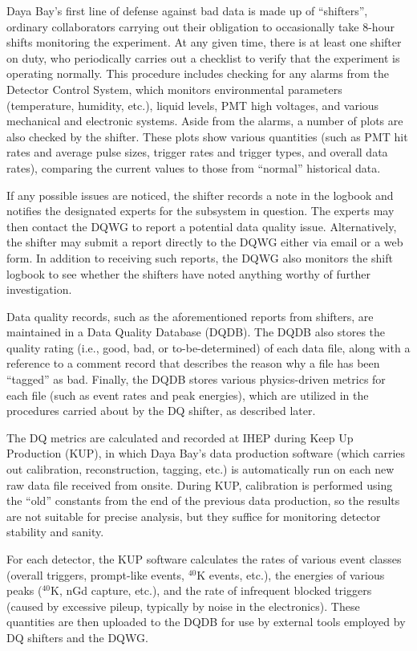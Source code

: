 \documentclass[../thesis.tex]{subfiles}
\begin{document}
Daya Bay's first line of defense against bad data is made up of ``shifters'', ordinary collaborators carrying out their obligation to occasionally take 8-hour shifts monitoring the experiment. At any given time, there is at least one shifter on duty, who periodically carries out a checklist to verify that the experiment is operating normally. This procedure includes checking for any alarms from the Detector Control System, which monitors environmental parameters (temperature, humidity, etc.), liquid levels, PMT high voltages, and various mechanical and electronic systems. Aside from the alarms, a number of plots are also checked by the shifter. These plots show various quantities (such as PMT hit rates and average pulse sizes, trigger rates and trigger types, and overall data rates), comparing the current values to those from ``normal'' historical data.

If any possible issues are noticed, the shifter records a note in the logbook and notifies the designated experts for the subsystem in question. The experts may then contact the DQWG to report a potential data quality issue. Alternatively, the shifter may submit a report directly to the DQWG either via email or a web form. In addition to receiving such reports, the DQWG also monitors the shift logbook to see whether the shifters have noted anything worthy of further investigation.

Data quality records, such as the aforementioned reports from shifters, are maintained in a Data Quality Database (DQDB). The DQDB also stores the quality rating (i.e., good, bad, or to-be-determined) of each data file, along with a reference to a comment record that describes the reason why a file has been ``tagged'' as bad. Finally, the DQDB stores various physics-driven metrics for each file (such as event rates and peak energies), which are utilized in the procedures carried about by the DQ shifter, as described later.

The DQ metrics are calculated and recorded at IHEP during Keep Up Production (KUP), in which Daya Bay's data production software (which carries out calibration, reconstruction, tagging, etc.) is automatically run on each new raw data file received from onsite. During KUP, calibration is performed using the ``old'' constants from the end of the previous data production, so the results are not suitable for precise analysis, but they suffice for monitoring detector stability and sanity.

For each detector, the KUP software calculates the rates of various event classes (overall triggers, prompt-like events, $^{40}$K events, etc.), the energies of various peaks ($^{40}$K, nGd capture, etc.), and the rate of infrequent blocked triggers (caused by excessive pileup, typically by noise in the electronics). These quantities are then uploaded to the DQDB for use by external tools employed by DQ shifters and the DQWG.
\end{document}
